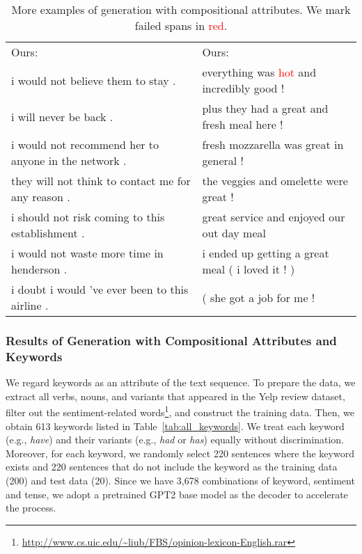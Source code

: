 \documentclass[11pt]{article}
\newcommand{\senc}[1]{\textcolor{red}{#1}}
\begin{document}
\begin{table}[ht]
\begin{tabular}{m{}m{}}
Ours:&Ours:\\
	\quad i would not believe them to stay .&\quad everything was \senc{hot} and incredibly good !\\
	\quad i will never be back .&\quad plus they had a great and fresh meal here !\\
	\quad i would not recommend her to anyone in the network .&\quad fresh mozzarella was great in general !\\
	\quad they will not think to contact me for any reason .&\quad the veggies and omelette were great !\\
	\quad i should not risk coming to this establishment .&\quad great service and enjoyed our out day meal\\
	\quad i would not waste more time in henderson .&\quad i ended up getting a great meal ( i loved it ! )\\
	\quad i doubt i would 've ever been to this airline .&\quad ( she got a job for me !   \\
	\bottomrule
    \end{tabular}
    \caption{More examples of generation with compositional attributes. We mark failed spans in \senc{red}.}
    \label{tab:cg_examples}
\end{table}


\clearpage
\subsubsection{Results of Generation with Compositional Attributes and Keywords}
\label{app:generation_keyword}

We regard keywords as an attribute of the text sequence. To prepare the data, we extract all verbs, nouns, and variants that appeared in the Yelp review dataset, filter out the sentiment-related words\footnote{\url{http://www.cs.uic.edu/~liub/FBS/opinion-lexicon-English.rar}}, and construct the training data. 
Then, we obtain 613 keywords listed in Table~\ref{tab:all_keywords}.
We treat each keyword (e.g., \textit{have}) and their variants (e.g., \textit{had} or \textit{has}) equally without discrimination. 
Moreover, for each keyword, we randomly select 220 sentences where the keyword exists and 220 sentences that do not include the keyword as the training data (200) and test data (20).
Since we have 3,678 combinations of keyword, sentiment and tense, we adopt a pretrained GPT2 base model as the decoder to accelerate the process.
\end{document}
